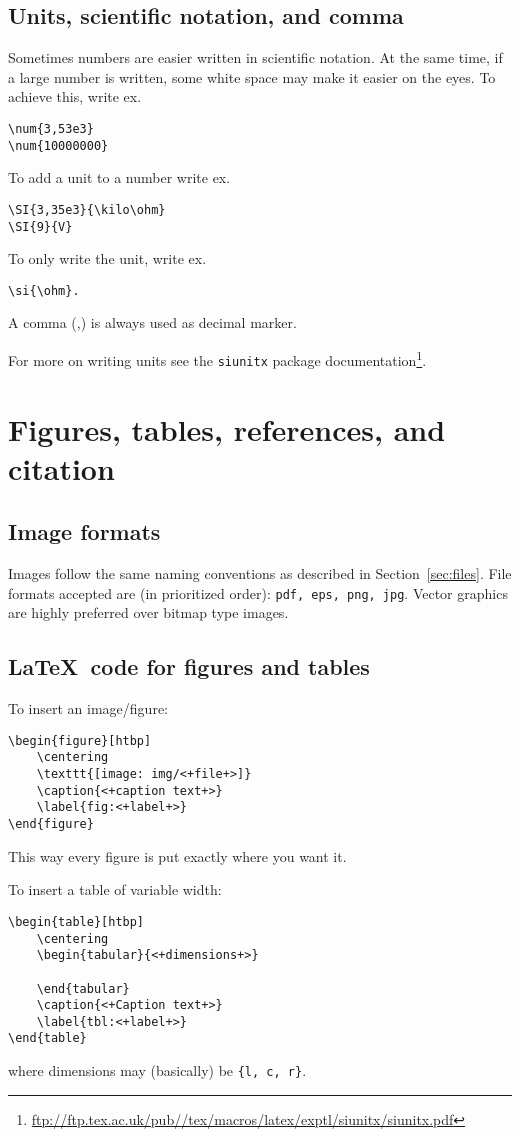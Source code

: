 \subsection{Units, scientific notation, and comma}
Sometimes numbers are easier written in scientific notation. At the same time, if a large number is written, some white space may make it easier on the eyes. To achieve this, write ex.
\begin{verbatim}
\num{3,53e3} 
\num{10000000}
\end{verbatim}
To add a unit to a number write ex.
\begin{verbatim}
\SI{3,35e3}{\kilo\ohm}
\SI{9}{V}
\end{verbatim}
To only write the unit, write ex.
\begin{verbatim}
\si{\ohm}. 
\end{verbatim}
A comma (,) is always used as decimal marker.


For more on writing units see the \texttt{siunitx} package documentation\footnote{\url{ftp://ftp.tex.ac.uk/pub//tex/macros/latex/exptl/siunitx/siunitx.pdf}}.


\section{Figures, tables, references, and citation}
\label{sec:figtabref}
\subsection{Image formats}
Images follow the same naming conventions as described in Section~\ref{sec:files}. File formats accepted are (in prioritized order): \texttt{pdf, eps, png, jpg}. Vector graphics are highly preferred over bitmap type images.


\subsection{\LaTeX\ code for figures and tables}
To insert an image\slash figure:
\begin{verbatim}
\begin{figure}[htbp]
    \centering
    \texttt{[image: img/<+file+>]}
    \caption{<+caption text+>}
    \label{fig:<+label+>}
\end{figure}
\end{verbatim}
This way every figure is put exactly where you want it.


To insert a table of variable width:
\begin{verbatim}
\begin{table}[htbp]
    \centering
    \begin{tabular}{<+dimensions+>}

    \end{tabular}
    \caption{<+Caption text+>}
    \label{tbl:<+label+>}
\end{table}
\end{verbatim}
where dimensions may (basically) be \texttt{\{l, c, r\}}.


